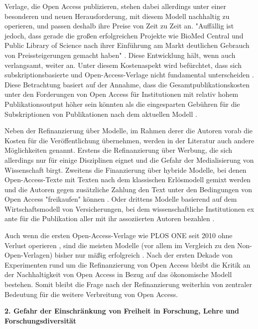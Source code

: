 Verlage, die Open Access publizieren, stehen dabei allerdings unter einer besonderen und neuen Herausforderung, mit diesem Modell nachhaltig zu operieren, und passen deshalb ihre Preise von Zeit zu Zeit an. "Auffällig ist jedoch, dass gerade die großen erfolgreichen Projekte wie BioMed Central und Public Library of Science nach ihrer Einführung am Markt deutlichen Gebrauch von Preissteigerungen gemacht haben" \cite[:181]{Schmidt_2007}. Diese Entwicklung hält, wenn auch verlangsamt, weiter an. Unter diesem Kostenaspekt wird befürchtet, dass sich subskriptionsbasierte und Open-Access-Verlage nicht fundamental unterscheiden \cite[:182]{Schmidt_2007}. Diese Betrachtung basiert auf der Annahme, dass die Gesamtpublikationskosten unter den Forderungen von Open Access für Institutionen mit relativ hohem Publikationsoutput höher sein könnten als die eingesparten Gebühren für die Subskriptionen von Publikationen nach dem aktuellen Modell \cite{Mueller-Langer_2010}.

Neben der Refinanzierung über Modelle, im Rahmen derer die Autoren vorab die Kosten für die Veröffentlichung übernehmen, werden in der Literatur auch andere Möglichkeiten genannt. Erstens die Refinanzierung über Werbung, die sich allerdings nur für einige Disziplinen \cite{Bjoerk_2004} eignet und die Gefahr der Medialisierung von Wissenschaft birgt. Zweitens die Finanzierung über hybride Modelle, bei denen Open-Access-Texte mit Texten nach dem klassischen Erlösmodell gemixt werden und die Autoren gegen zusätzliche Zahlung den Text unter den Bedingungen von Open Access "freikaufen" können \cite{Bjoerk_2012}. Oder drittens Modelle basierend auf dem Wirtschaftsmodell von Versicherungen, bei dem wissenschaftliche Institutionen ex ante für die Publikation aller mit ihr assoziierten Autoren bezahlen \cite[:63]{Mueller-Langer_2010}.

Auch wenn die ersten Open-Access-Verlage wie PLOS ONE seit 2010 ohne Verlust operieren \cite{Jerram_2010}, sind die meisten Modelle (vor allem im Vergleich zu den Non-Open-Verlagen) bisher nur mäßig erfolgreich \cite{Bjoerk_2012}. Nach der ersten Dekade von Experimenten rund um die Refinanzierung von Open Access bleibt die Kritik an der Nachhaltigkeit von Open Access in Bezug auf das ökonomische Modell bestehen. Somit bleibt die Frage nach der Refinanzierung weiterhin von zentraler Bedeutung für die weitere Verbreitung von Open Access.

\textbf{2. Gefahr der Einschränkung von Freiheit in Forschung, Lehre und Forschungsdiversität}

